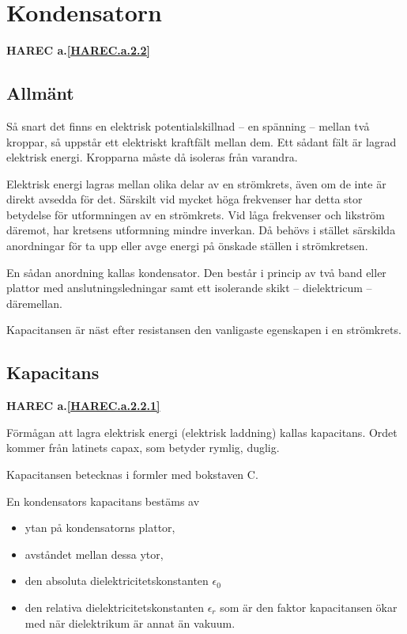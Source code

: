 \section{Kondensatorn}
\textbf{HAREC a.\ref{HAREC.a.2.2}\label{myHAREC.a.2.2}}

\subsection{Allmänt}

Så snart det finns en elektrisk potentialskillnad -- en spänning -- mellan två
kroppar, så uppstår ett elektriskt kraftfält mellan dem. Ett sådant fält är
lagrad elektrisk energi. Kropparna måste då isoleras från varandra.

Elektrisk energi lagras mellan olika delar av en strömkrets, även om de inte är
direkt avsedda för det. Särskilt vid mycket höga frekvenser har detta stor
betydelse för utformningen av en strömkrets. Vid låga frekvenser och likström
däremot, har kretsens utformning mindre inverkan. Då behövs i stället särskilda
anordningar för ta upp eller avge energi på önskade ställen i strömkretsen.

En sådan anordning kallas kondensator. Den består i princip av två band eller
plattor med anslutningsledningar samt ett isolerande skikt -- dielektricum --
däremellan.

Kapacitansen är näst efter resistansen den vanligaste egenskapen i en
strömkrets.

\subsection{Kapacitans}
\textbf{HAREC a.\ref{HAREC.a.2.2.1}\label{myHAREC.a.2.2.1}}

Förmågan att lagra elektrisk energi (elektrisk laddning) kallas kapacitans.
Ordet kommer från latinets capax, som betyder rymlig, duglig.

Kapacitansen betecknas i formler med bokstaven C.

En kondensators kapacitans bestäms av
\begin{itemize}
  \item ytan på kondensatorns plattor,
  \item avståndet mellan dessa ytor,
  \item den absoluta dielektricitetskonstanten \(\epsilon_0\)
  \item den relativa dielektricitetskonstanten \(\epsilon_r\) som är den faktor
kapacitansen ökar med när dielektrikum är annat än vakuum.
\end{itemize}

